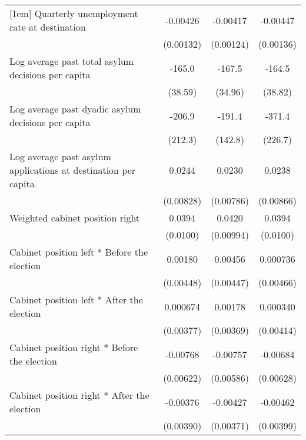 \begin{table}[htbp]
\begin{tabular}{l*{3}{c}}
[1em]
Quarterly unemployment rate at destination&    -0.00426\sym{**} &    -0.00417\sym{**} &    -0.00447\sym{**} \\
                    &   (0.00132)         &   (0.00124)         &   (0.00136)         \\
[1em]
Log average past total asylum decisions per capita&      -165.0\sym{***}&      -167.5\sym{***}&      -164.5\sym{***}\\
                    &     (38.59)         &     (34.96)         &     (38.82)         \\
[1em]
Log average past dyadic asylum decisions per capita&      -206.9         &      -191.4         &      -371.4         \\
                    &     (212.3)         &     (142.8)         &     (226.7)         \\
[1em]
Log average past asylum applications at destination per capita&      0.0244\sym{**} &      0.0230\sym{**} &      0.0238\sym{**} \\
                    &   (0.00828)         &   (0.00786)         &   (0.00866)         \\
[1em]
Weighted cabinet position right&      0.0394\sym{***}&      0.0420\sym{***}&      0.0394\sym{***}\\
                    &    (0.0100)         &   (0.00994)         &    (0.0100)         \\
[1em]
Cabinet position left * Before the election&     0.00180         &     0.00456         &    0.000736         \\
                    &   (0.00448)         &   (0.00447)         &   (0.00466)         \\
[1em]
Cabinet position left * After the election&    0.000674         &     0.00178         &    0.000340         \\
                    &   (0.00377)         &   (0.00369)         &   (0.00414)         \\
[1em]
Cabinet position right * Before the election&    -0.00768         &    -0.00757         &    -0.00684         \\
                    &   (0.00622)         &   (0.00586)         &   (0.00628)         \\
[1em]
Cabinet position right * After the election&    -0.00376         &    -0.00427         &    -0.00462         \\
                    &   (0.00390)         &   (0.00371)         &   (0.00399)         \\

\end{tabular}
\end{table}
